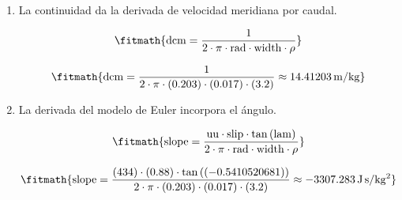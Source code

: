 \begin{enumerate}

\item La continuidad da la derivada de velocidad meridiana por caudal.

\[\fitmath{\mathrm{dcm}=\frac{1}{2\cdot \pi\cdot \mathrm{rad}\cdot \mathrm{width}\cdot \rho}}\]

\[\fitmath{\mathrm{dcm}=\frac{1}{2\cdot \pi\cdot (0.203)\cdot (0.017)\cdot (3.2)}\approx 14.41203\,\mathrm{m/kg}}\]

\item La derivada del modelo de Euler incorpora el ángulo.

\[\fitmath{\mathrm{slope}=\frac{\mathrm{uu}\cdot \mathrm{slip}\cdot \tan\left(\mathrm{lam}\right)}{2\cdot \pi\cdot \mathrm{rad}\cdot \mathrm{width}\cdot \rho}}\]

\[\fitmath{\mathrm{slope}=\frac{(434)\cdot (0.88)\cdot \tan\left((-0.5410520681)\right)}{2\cdot \pi\cdot (0.203)\cdot (0.017)\cdot (3.2)}\approx -3307.283\,\mathrm{J\,s/kg^{2}}}\]

\end{enumerate}
